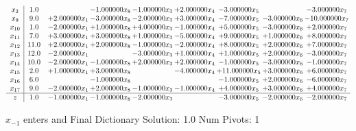 \documentclass[10pt]{article}
\begin{document}
 \[\begin{array}{c| c c@{\hskip 2pt} c@{\hskip 2pt} c@{\hskip 2pt} c@{\hskip 2pt} c@{\hskip 2pt} c@{\hskip 2pt} c@{\hskip 2pt} }
 x_{2}   &  1.0  &   & -1.000000 x_{8} & -1.000000 x_{3} & + 2.000000 x_{4} & -3.000000 x_{5} &   & -3.000000 x_{7}\\
 x_{9}   &  9.0 & + 2.000000 x_{1} & -3.000000 x_{8} & -2.000000 x_{3} & + 3.000000 x_{4} & -7.000000 x_{5} & -3.000000 x_{6} & -10.000000 x_{7}\\
 x_{10}   &  1.0 & -2.000000 x_{1} & + 1.000000 x_{8} & + 4.000000 x_{3} & -1.000000 x_{4} & + 5.000000 x_{5} & -3.000000 x_{6} & + 2.000000 x_{7}\\
 x_{11}   &  7.0 & + 3.000000 x_{1} & + 3.000000 x_{8} & + 1.000000 x_{3} & -5.000000 x_{4} & + 9.000000 x_{5} & + 1.000000 x_{6} & + 8.000000 x_{7}\\
 x_{12}   &  11.0 & + 2.000000 x_{1} & + 2.000000 x_{8} & -1.000000 x_{3} & -2.000000 x_{4} & + 8.000000 x_{5} & + 2.000000 x_{6} & + 7.000000 x_{7}\\
 x_{13}   &  12.0 & -2.000000 x_{1} &   & -3.000000 x_{3} & + 1.000000 x_{4} & + 1.000000 x_{5} & + 2.000000 x_{6} & -3.000000 x_{7}\\
 x_{14}   &  10.0 & -2.000000 x_{1} & -1.000000 x_{8} & + 2.000000 x_{3} & + 2.000000 x_{4} & -1.000000 x_{5} & -3.000000 x_{6} & -1.000000 x_{7}\\
 x_{15}   &  2.0 & + 1.000000 x_{1} & + 3.000000 x_{8} &   & -4.000000 x_{4} & + 11.000000 x_{5} & + 3.000000 x_{6} & + 6.000000 x_{7}\\
 x_{16}   &  6.0  &   & -1.000000 x_{8} &    &   & -1.000000 x_{5} & + 2.000000 x_{6} & -6.000000 x_{7}\\
 x_{17}   &  9.0 & -2.000000 x_{1} & + 2.000000 x_{8} & -1.000000 x_{3} & -1.000000 x_{4} & + 4.000000 x_{5} & + 3.000000 x_{6} & + 4.000000 x_{7}\\
\hline
z    &  1.0 & -1.000000 x_{1} & -1.000000 x_{8} & -2.000000 x_{3} &   & -3.000000 x_{5} & -2.000000 x_{6} & -2.000000 x_{7}\\
\end{array}\]


 $ x_{-1} $ enters and Final Dictionary
Solution:  1.0
Num Pivots:  1
\end{document}

